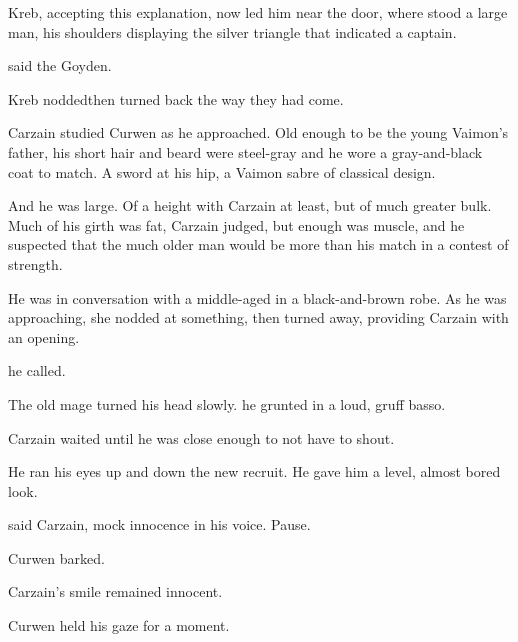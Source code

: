 
Kreb, accepting this explanation, now led him near the door, where stood a large man, his shoulders displaying the silver triangle that indicated a captain. 

 said the Goyden. 


Kreb nodded\dash{}\dash then turned back the way they had come. 

Carzain studied Curwen as he approached. Old enough to be the young Vaimon's father, his short hair and beard were steel-gray and he wore a gray-and-black coat to match. A sword at his hip, a Vaimon sabre of classical design. 

And he was large. Of a height with Carzain at least, but of much greater bulk. Much of his girth was fat, Carzain judged, but enough was muscle, and he suspected that the much older man would be more than his match in a contest of strength. 

He was in conversation with a middle-aged \sphyle{} in a black-and-brown robe. %
As he was approaching, she nodded at something, then turned away, providing Carzain with an opening. 

 he called. 

The old mage turned his head slowly. 
 he grunted in a loud, gruff basso. 

Carzain waited until he was close enough to not have to shout. 

 He ran his eyes up and down the new recruit. 
 He gave him a level, almost bored look.

 said Carzain, mock innocence in his voice. 
Pause. 

 Curwen barked. 

 Carzain's smile remained innocent. 

Curwen held his gaze for a moment. 

